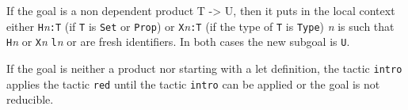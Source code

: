 If the goal is a non dependent product T -> U, then it puts in the
local context either {\tt H}{\it n}{\tt :T} (if {\tt T} is {\tt Set}
or {\tt Prop}) or {\tt X}{\it n}{\tt :T} (if the type of {\tt T} is
{\tt Type}) {\it n} is such that {\tt H}{\it n} or {\tt X}{\it n}
{\tt l}{\it n} or are fresh identifiers.  In both cases the new
subgoal is {\tt U}.

If the goal is neither a product nor starting with a let definition,
the tactic {\tt intro} applies the tactic {\tt red} until the tactic
{\tt intro} can be applied or the goal is not reducible.

\begin{ErrMsgs}
\item {}
\item {}
\end{ErrMsgs}

